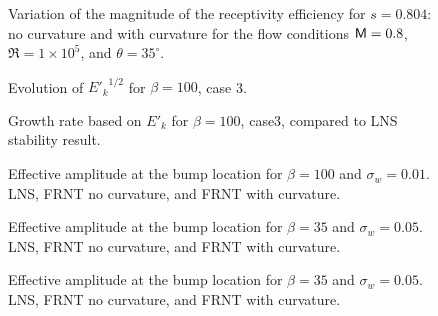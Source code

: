 %
\begin{figure}[p]
\centering
\sethlabel{$\beta$}
\setvlabel{$|\Lambda|$}
\epsfxsize=5.4in 
\caption[Variation of the magnitude of the receptivity efficiency with and
without curvature] {Variation of the magnitude of the receptivity efficiency
for $s=0.804$: \solid no curvature and \dashed with curvature for the flow
conditions ${\sf M}=0.8$, $\Re=1\times 10^5$, and $\theta=35^\circ$.
\label{f:LambdaBeta} }
\end{figure}
%
%
\begin{figure}[p]
\centering
{}
\epsfxsize=5.4in 
\caption {Evolution of ${E'_k}^{1/2}$ for $\beta=100$, case 3. \label{f:45} }
\end{figure}
%
\begin{figure}[p]
\centering
\sethlabel{$\beta$}
\setvlabel{$\sigma$}
\epsfxsize=5.4in 
\caption[Growth rate based on $E'_k$ for $\beta=100$] {Growth rate based on
$E'_k$ for $\beta=100$, \dashed case3, compared to \solid LNS stability
result. \label{f:46} }
\end{figure}
%
%
\begin{figure}[p]
\centering
{}
\epsfxsize=5.4in 
\caption [Effective amplitude at the bump location for $\beta=100$ and
$\sigma_w=0.01$]{Effective amplitude at the bump location for $\beta=100$ and
$\sigma_w=0.01$. \linecirc LNS, \dashed FRNT no curvature, and \dotted FRNT
with curvature. \label{f:47} }
\end{figure}
%
%
\begin{figure}[p]
\centering
{}
\epsfxsize=5.4in 
\caption [Effective amplitude at the bump location for $\beta=35$ and
$\sigma_w=0.05$]{Effective amplitude at the bump location for $\beta=35$ and
$\sigma_w=0.05$. \linecirc LNS, \dashed FRNT no curvature, and \dotted FRNT
with curvature.
\label{f:48} }
\end{figure}
%
\clearpage
%
%
\begin{figure}[p]
\centering
{}
\epsfxsize=5.4in 
\caption [Effective amplitude at the bump location for $\beta=35$ and
$\sigma_w=0.05$]{Effective amplitude at the bump location for $\beta=35$ and
$\sigma_w=0.05$. \linecirc LNS, \dashed FRNT no curvature, and \dotted FRNT
with curvature. \label{f:49} }
\end{figure}
